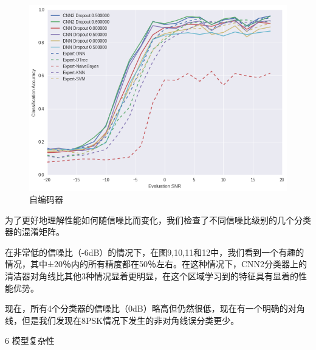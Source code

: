\begin{figure}[!h]
	\centering
	\includegraphics[scale=0.3]{figures/chapter_3/result}
	\caption{自编码器}	\label{fig_3_2}
\end{figure}


为了更好地理解性能如何随信噪比而变化，我们检查了不同信噪比级别的几个分类器的混淆矩阵。\par

在非常低的信噪比（-6dB）的情况下，在图9,10,11和12中，我们看到一个有趣的情况，其中±20％内的所有精度都在50％左右。在这种情况下，CNN2分类器上的清洁器对角线比其他3种情况显着更明显，在这个区域学习到的特征具有显着的性能优势。\par

现在，所有4个分类器的信噪比（0dB）略高但仍然很低，现在有一个明确的对角线，但是我们发现在8PSK情况下发生的非对角线误分类更少。\par

6 模型复杂性\par

